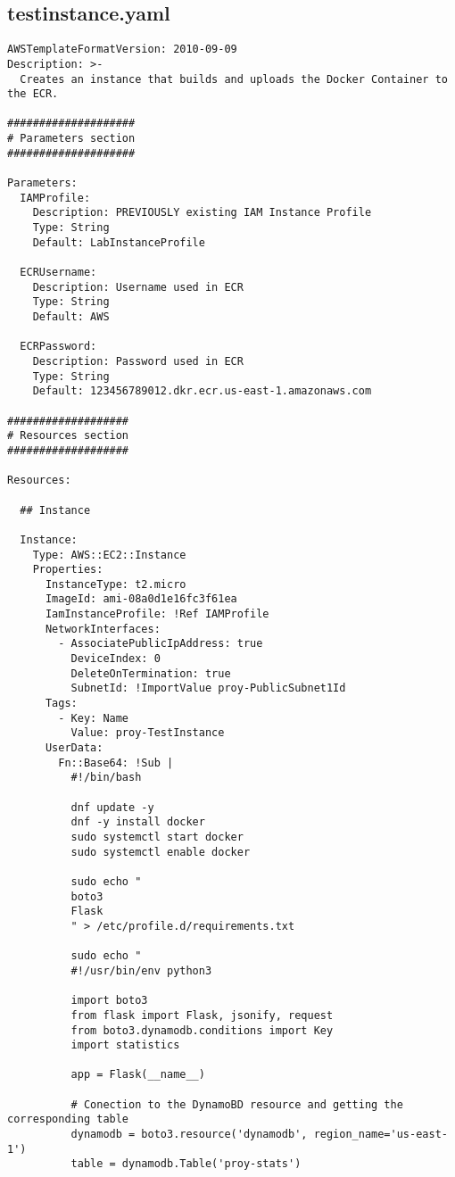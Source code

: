 \subsection{testinstance.yaml}

\begin{verbatim}
AWSTemplateFormatVersion: 2010-09-09
Description: >-
  Creates an instance that builds and uploads the Docker Container to the ECR.

####################
# Parameters section
####################

Parameters:
  IAMProfile:
    Description: PREVIOUSLY existing IAM Instance Profile
    Type: String
    Default: LabInstanceProfile

  ECRUsername:
    Description: Username used in ECR
    Type: String
    Default: AWS

  ECRPassword:
    Description: Password used in ECR
    Type: String
    Default: 123456789012.dkr.ecr.us-east-1.amazonaws.com

###################
# Resources section
###################

Resources:

  ## Instance

  Instance:
    Type: AWS::EC2::Instance
    Properties:
      InstanceType: t2.micro
      ImageId: ami-08a0d1e16fc3f61ea
      IamInstanceProfile: !Ref IAMProfile
      NetworkInterfaces:
        - AssociatePublicIpAddress: true
          DeviceIndex: 0
          DeleteOnTermination: true
          SubnetId: !ImportValue proy-PublicSubnet1Id
      Tags:
        - Key: Name
          Value: proy-TestInstance
      UserData:
        Fn::Base64: !Sub |
          #!/bin/bash

          dnf update -y
          dnf -y install docker
          sudo systemctl start docker
          sudo systemctl enable docker

          sudo echo "
          boto3
          Flask
          " > /etc/profile.d/requirements.txt

          sudo echo "
          #!/usr/bin/env python3

          import boto3
          from flask import Flask, jsonify, request
          from boto3.dynamodb.conditions import Key
          import statistics

          app = Flask(__name__)

          # Conection to the DynamoBD resource and getting the corresponding table
          dynamodb = boto3.resource('dynamodb', region_name='us-east-1')
          table = dynamodb.Table('proy-stats')


\end{verbatim}

